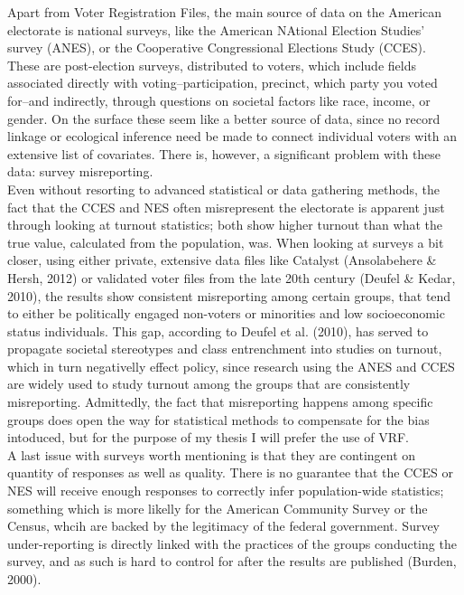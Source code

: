 \documentclass[12pt,twoside]{reedthesis}
\begin{document}
  Apart from Voter Registration Files, the main source of data on the
  American electorate is national surveys, like the American NAtional
  Election Studies' survey (ANES), or the Cooperative Congressional
  Elections Study (CCES). These are post-election surveys, distributed to
  voters, which include fields associated directly with
  voting--participation, precinct, which party you voted for--and
  indirectly, through questions on societal factors like race, income, or
  gender. On the surface these seem like a better source of data, since no
  record linkage or ecological inference need be made to connect
  individual voters with an extensive list of covariates. There is,
  however, a significant problem with these data: survey misreporting.\\
  Even without resorting to advanced statistical or data gathering
  methods, the fact that the CCES and NES often misrepresent the
  electorate is apparent just through looking at turnout statistics; both
  show higher turnout than what the true value, calculated from the
  population, was. When looking at surveys a bit closer, using either
  private, extensive data files like Catalyst (Ansolabehere \& Hersh,
  2012) or validated voter files from the late 20th century (Deufel \&
  Kedar, 2010), the results show consistent misreporting among certain
  groups, that tend to either be politically engaged non-voters or
  minorities and low socioeconomic status individuals. This gap, according
  to Deufel et al. (2010), has served to propagate societal stereotypes
  and class entrenchment into studies on turnout, which in turn
  negativelly effect policy, since research using the ANES and CCES are
  widely used to study turnout among the groups that are consistently
  misreporting. Admittedly, the fact that misreporting happens among
  specific groups does open the way for statistical methods to compensate
  for the bias intoduced, but for the purpose of my thesis I will prefer
  the use of VRF.\\
  A last issue with surveys worth mentioning is that they are contingent
  on quantity of responses as well as quality. There is no guarantee that
  the CCES or NES will receive enough responses to correctly infer
  population-wide statistics; something which is more likelly for the
  American Community Survey or the Census, whcih are backed by the
  legitimacy of the federal government. Survey under-reporting is directly
  linked with the practices of the groups conducting the survey, and as
  such is hard to control for after the results are published (Burden,
  2000).
  
\end{document}
